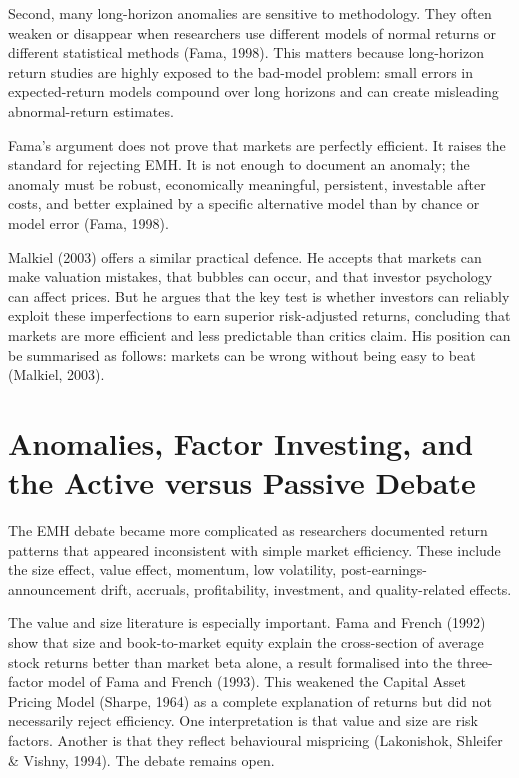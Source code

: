 \documentclass[11pt,a4paper]{article}
\begin{document}
Second, many long-horizon anomalies are sensitive to methodology. They often weaken or disappear when researchers use different models of normal returns or different statistical methods (Fama, 1998). This matters because long-horizon return studies are highly exposed to the bad-model problem: small errors in expected-return models compound over long horizons and can create misleading abnormal-return estimates.

Fama's argument does not prove that markets are perfectly efficient. It raises the standard for rejecting EMH. It is not enough to document an anomaly; the anomaly must be robust, economically meaningful, persistent, investable after costs, and better explained by a specific alternative model than by chance or model error (Fama, 1998).

Malkiel (2003) offers a similar practical defence. He accepts that markets can make valuation mistakes, that bubbles can occur, and that investor psychology can affect prices. But he argues that the key test is whether investors can reliably exploit these imperfections to earn superior risk-adjusted returns, concluding that markets are more efficient and less predictable than critics claim. His position can be summarised as follows: markets can be wrong without being easy to beat (Malkiel, 2003).

\section{Anomalies, Factor Investing, and the Active versus Passive Debate}

The EMH debate became more complicated as researchers documented return patterns that appeared inconsistent with simple market efficiency. These include the size effect, value effect, momentum, low volatility, post-earnings-announcement drift, accruals, profitability, investment, and quality-related effects.

The value and size literature is especially important. Fama and French (1992) show that size and book-to-market equity explain the cross-section of average stock returns better than market beta alone, a result formalised into the three-factor model of Fama and French (1993). This weakened the Capital Asset Pricing Model (Sharpe, 1964) as a complete explanation of returns but did not necessarily reject efficiency. One interpretation is that value and size are risk factors. Another is that they reflect behavioural mispricing (Lakonishok, Shleifer \& Vishny, 1994). The debate remains open.
\end{document}
